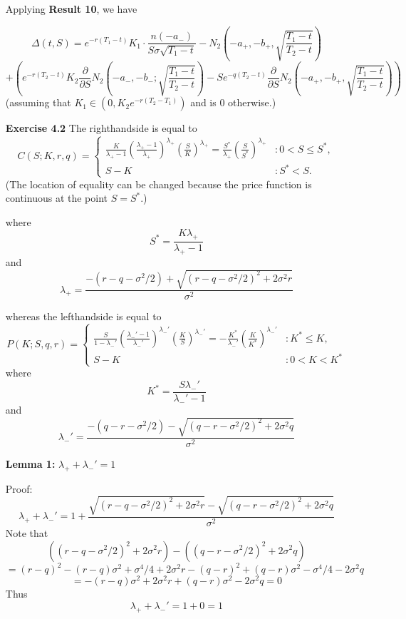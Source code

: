 \documentclass{article}[12pt,a4paper]
\begin{document}
\begin{enumerate}
  Applying \textbf{Result 10}, we have
  
  $$\Delta(t, S) = e^{-r(T_1 - t)} K_1 \cdot \frac{n(-a_-)}{S \sigma \sqrt{T_1 - t}} - 
  N_2(-a_+, -b_+, \sqrt{\frac{T_1 - t}{T_2 - t}})$$
   $$+ (e^{-r(T_2 - t)}K_2 \frac{\partial}{\partial S}N_2(-a_-, -b_-; \sqrt{\frac{T_1 - t}{T_2 - t}})
  - Se^{-q(T_2 - t)} \frac{\partial}{\partial S} N_2(-a_+, -b_+, \sqrt{\frac{T_1 - t}{T_2 - t}}))$$
  \hfill (assuming that $K_1 \in  (0,  K_2e^{-r(T_2 - T_1)})$ and is $0$ otherwise.)
  
  \pagebreak
  
  
   \item[\textbf{Exercise 4.2}]
  The righthandside is equal to
  $$C(S; K, r, q) = \left\{
  			\begin{array}{ll}
  			\frac{K}{\lambda_+ - 1}(\frac{\lambda_+ - 1}{\lambda_+})^{\lambda_+}
  			(\frac{S}{K})^{\lambda_+} = \frac{S^*}{\lambda_+}(\frac{S}{S^*})^{\lambda_+}
  			& : 0 < S \le S^*,\\
  			S - K & : S^* < S.
  			\end{array}
  \right.$$
  \hfill (The location of equality can be changed because the price function is continuous at the point $S = S^*$.)
  
  where
  $$S^* = \frac{K\lambda_+}{\lambda_+ - 1}$$
  and
  $$\lambda_{+} = \frac{-(r - q - \sigma^2/2) + \sqrt{(r - q - \sigma^2/2)^2 + 2\sigma^2r}}{\sigma^2}$$
  
  whereas the lefthandside is equal to
  $$P(K; S, q, r) = \left\{
  			\begin{array}{ll}
  			\frac{S}{1 - \lambda_-'}(\frac{\lambda_-' - 1}{\lambda_-'})^{\lambda_-'}(\frac{K}{S})^{\lambda_-'} 
  			= -\frac{K^*}{\lambda_-'}(\frac{K}{K^*})^{\lambda_-'}& : K^* \le K, \\
  			S - K & : 0 < K < K^*
  			\end{array}
  \right.$$
  where 
  $$K^* = \frac{S\lambda_-'}{\lambda_-' - 1}$$
  and
  $$\lambda_{-}' = \frac{-(q - r - \sigma^2/2) - \sqrt{(q - r -\sigma^2/2)^2 + 2 \sigma^2q}}{\sigma^2}$$
  
  \textbf{Lemma 1:} $\lambda_+ + \lambda_-' = 1$
  
  Proof:
  $$\lambda_+ + \lambda_-' = 1 + \frac{\sqrt{(r - q - \sigma^2/2)^2 + 2\sigma^2r } 
  - \sqrt{(q - r - \sigma^2/2)^2 + 2\sigma^2q}}{\sigma^2}$$
  Note that
  $$((r - q - \sigma^2/2)^2 + 2\sigma^2r) - ((q - r - \sigma^2/2)^2 + 2\sigma^2q)$$
  $$= (r - q)^2 - (r - q)\sigma^2 + \sigma^4/4 + 2\sigma^2r - (q - r)^2 + (q - r)\sigma^2 - \sigma^4/4 - 2\sigma^2q$$
  $$= -(r - q)\sigma^2 + 2\sigma^2r + (q - r)\sigma^2 - 2\sigma^2q = 0$$
  Thus 
  $$\lambda_+ + \lambda_-' = 1 + 0 = 1$$
  

\end{enumerate}
\end{document}
